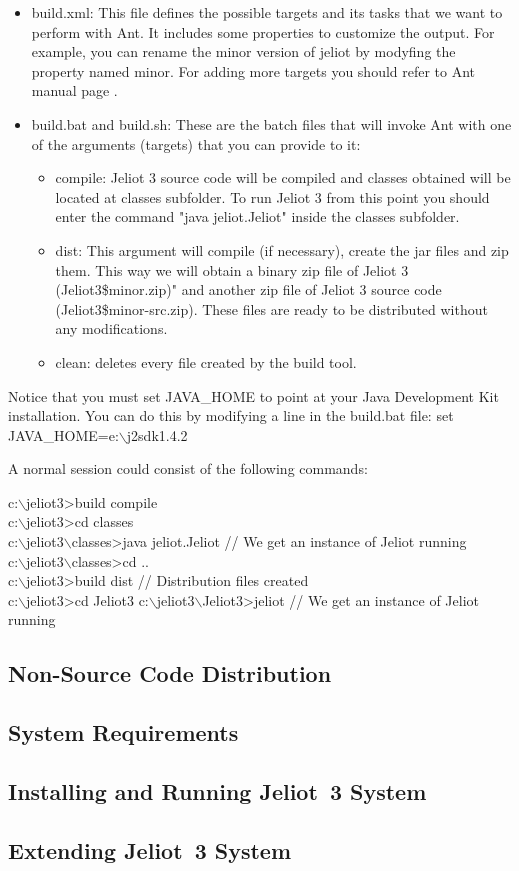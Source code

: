\begin{itemize}
\item build.xml: This file defines the possible targets and its tasks that we want to perform with Ant. It includes some properties to customize the output. For example, you can rename the minor version of jeliot by modyfing the property named minor. For adding more targets you should refer to Ant manual page .
\item build.bat and build.sh: These are the batch files that will invoke Ant with one of the arguments (targets) that you can provide to it:
\begin{itemize}
\item compile: Jeliot 3 source code will be compiled and classes obtained will be located at classes subfolder. To run Jeliot 3 from this point you should enter the command "java jeliot.Jeliot" inside the classes subfolder.
\item dist: This argument will compile (if necessary), create the jar files and zip them. This way we will obtain a binary zip file of Jeliot 3 (Jeliot3\${minor}.zip)" and another zip file of Jeliot 3 source code (Jeliot3\${minor}-src.zip). These files are ready to be distributed without any modifications.
\item clean: deletes every file created by the build tool.
\end{itemize}
\end{itemize}

Notice that you must set JAVA\_HOME to point at your Java Development Kit installation. You can do this by modifying a line in the build.bat file:
set JAVA\_HOME=e:$\backslash$j2sdk1.4.2

A normal session could consist of the following commands:

c:$\backslash$jeliot3>build compile\\
c:$\backslash$jeliot3>cd classes\\
c:$\backslash$jeliot3$\backslash$classes>java jeliot.Jeliot   // We get an instance of Jeliot running\\
c:$\backslash$jeliot3$\backslash$classes>cd ..\\
c:$\backslash$jeliot3>build dist       // Distribution files created\\
c:$\backslash$jeliot3>cd Jeliot3
c:$\backslash$jeliot3$\backslash$Jeliot3>jeliot   // We get an instance of Jeliot running\\

\subsection{Non-Source Code Distribution}
\label{sec:Non_Source_Code_Distribution}


\subsection{System Requirements}
\label{sec:System_Requirements}


\subsection{Installing and Running Jeliot~3 System}
\label{sec:Installing_and_Running_Jeliot_3_System}


\subsection{Extending Jeliot~3 System}
\label{sec:Extending_Jeliot_3_System}